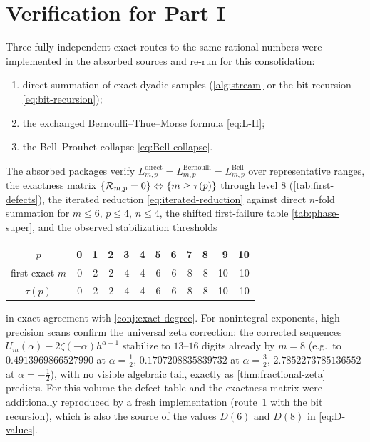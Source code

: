 \section{Verification for Part I}
\label{sec:verification-sums}

Three fully independent exact routes to the same rational numbers were
implemented in the absorbed sources and re-run for this
consolidation:
\begin{enumerate}
\item direct summation of exact dyadic samples
(\cref{alg:stream} or the bit recursion \eqref{eq:bit-recursion});
\item the exchanged Bernoulli--Thue--Morse formula \eqref{eq:L-H};
\item the Bell--Prouhet collapse \eqref{eq:Bell-collapse}.
\end{enumerate}
The absorbed packages verify
$L^{\mathrm{direct}}_{m,p}=L^{\mathrm{Bernoulli}}_{m,p}
=L^{\mathrm{Bell}}_{m,p}$ over representative ranges, the exactness
matrix $\{\mathcal R_{m,p}=0\}\Leftrightarrow\{m\ge\tau(p)\}$ through
level $8$ (\cref{tab:first-defects}), the iterated reduction
\eqref{eq:iterated-reduction} against direct $n$-fold summation for
$m\le6$, $p\le4$, $n\le4$, the shifted first-failure table
\ref{tab:phase-super}, and the observed stabilization thresholds
\begin{center}
\small
\begin{tabular}{c|rrrrrrrrrrr}
\toprule
$p$ & 0&1&2&3&4&5&6&7&8&9&10\\
\midrule
first exact $m$ & 0&2&2&4&4&6&6&8&8&10&10\\
$\tau(p)$       & 0&2&2&4&4&6&6&8&8&10&10\\
\bottomrule
\end{tabular}
\end{center}
in exact agreement with \cref{conj:exact-degree}.  For nonintegral
exponents, high-precision scans confirm the universal zeta correction:
the corrected sequences $U_m(\alpha)-2\zeta(-\alpha)h^{\alpha+1}$
stabilize to $13$--$16$ digits already by $m=8$ (e.g.\ to
$0.4913969866527990$ at $\alpha=\tfrac12$, $0.1707208835839732$ at
$\alpha=\tfrac32$, $2.7852273785136552$ at $\alpha=-\tfrac12$), with
no visible algebraic tail, exactly as \cref{thm:fractional-zeta}
predicts.  For this volume the defect table and the exactness matrix
were additionally reproduced by a fresh implementation (route~1 with
the bit recursion), which is also the source of the values $D(6)$ and
$D(8)$ in \eqref{eq:D-values}.

